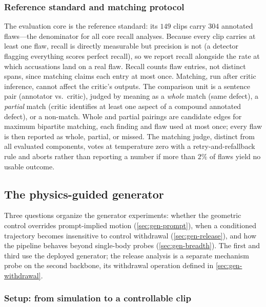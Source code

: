 \subsubsection{Reference standard and matching protocol}\label{sec:eval-protocol}
The evaluation core is the reference standard: its $149$ clips carry $304$ annotated flaws---the denominator for all core recall analyses. Because every clip carries at least one flaw, recall is directly measurable but precision is not (a detector flagging everything scores perfect recall), so we report recall alongside the rate at which accusations land on a real flaw. Recall counts flaw entries, not distinct spans, since matching claims each entry at most once. Matching\label{sec:matching}, run after critic inference, cannot affect the critic's outputs. The comparison unit is a sentence pair (annotator vs.\ critic), judged by meaning as a \emph{whole} match (same defect), a \emph{partial} match (critic identifies at least one aspect of a compound annotated defect), or a non-match. Whole and partial pairings are candidate edges for maximum bipartite matching, each finding and flaw used at most once; every flaw is then reported as whole, partial, or missed. The matching judge, distinct from all evaluated components, votes at temperature zero with a retry-and-refallback rule and aborts rather than reporting a number if more than $2\%$ of flaws yield no usable outcome.
\subsection{The physics-guided generator}\label{sec:gen-experiments}

Three questions organize the generator experiments: whether the geometric control overrides
prompt-implied motion (\cref{sec:gen-prompt}), when a conditioned trajectory becomes insensitive to
control withdrawal (\cref{sec:gen-release}), and how the pipeline behaves beyond single-body probes
(\cref{sec:gen-breadth}). The first and third use the deployed generator; the release analysis is a
separate mechanism probe on the second backbone, its withdrawal operation defined in
\cref{sec:gen-withdrawal}.

\subsubsection{Setup: from simulation to a controllable clip}\label{sec:gen-setup}

